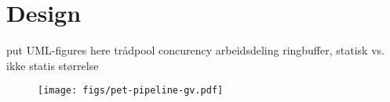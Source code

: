 \section{Design}
put UML-figures here
trådpool
concurency
arbeidsdeling
ringbuffer, statisk vs. ikke statis størrelse

\begin{figure}
    \texttt{[image: figs/pet-pipeline-gv.pdf]}
\end{figure}
